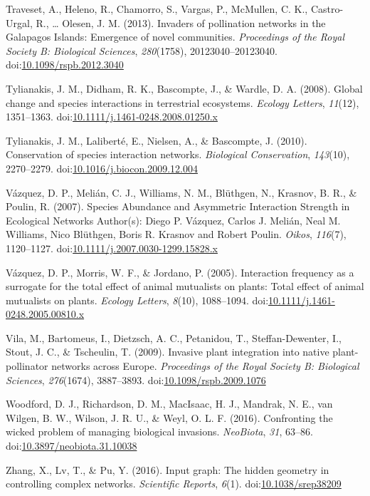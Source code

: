 \documentclass[a4paper]{artikel1}
\theoremstyle{definition}
\theoremstyle{definition}
\theoremstyle{definition}
\theoremstyle{remark}
\begin{document}
\hypertarget{ref-traveset_invaders_2013}{}
Traveset, A., Heleno, R., Chamorro, S., Vargas, P., McMullen, C. K.,
Castro-Urgal, R., \ldots{} Olesen, J. M. (2013). Invaders of pollination
networks in the Galapagos Islands: Emergence of novel communities.
\emph{Proceedings of the Royal Society B: Biological Sciences},
\emph{280}(1758), 20123040--20123040.
doi:\href{https://doi.org/10.1098/rspb.2012.3040}{10.1098/rspb.2012.3040}

\hypertarget{ref-tylianakis_global_2008}{}
Tylianakis, J. M., Didham, R. K., Bascompte, J., \& Wardle, D. A.
(2008). Global change and species interactions in terrestrial
ecosystems. \emph{Ecology Letters}, \emph{11}(12), 1351--1363.
doi:\href{https://doi.org/10.1111/j.1461-0248.2008.01250.x}{10.1111/j.1461-0248.2008.01250.x}

\hypertarget{ref-tylianakis_conservation_2010}{}
Tylianakis, J. M., Laliberté, E., Nielsen, A., \& Bascompte, J. (2010).
Conservation of species interaction networks. \emph{Biological
Conservation}, \emph{143}(10), 2270--2279.
doi:\href{https://doi.org/10.1016/j.biocon.2009.12.004}{10.1016/j.biocon.2009.12.004}

\hypertarget{ref-vazquez_species_2007}{}
Vázquez, D. P., Melián, C. J., Williams, N. M., Blüthgen, N., Krasnov,
B. R., \& Poulin, R. (2007). Species Abundance and Asymmetric
Interaction Strength in Ecological Networks Author(s): Diego P. Vázquez,
Carlos J. Melián, Neal M. Williams, Nico Blüthgen, Boris R. Krasnov and
Robert Poulin. \emph{Oikos}, \emph{116}(7), 1120--1127.
doi:\href{https://doi.org/10.1111/j.2007.0030-1299.15828.x}{10.1111/j.2007.0030-1299.15828.x}

\hypertarget{ref-vazquez_interaction_2005}{}
Vázquez, D. P., Morris, W. F., \& Jordano, P. (2005). Interaction
frequency as a surrogate for the total effect of animal mutualists on
plants: Total effect of animal mutualists on plants. \emph{Ecology
Letters}, \emph{8}(10), 1088--1094.
doi:\href{https://doi.org/10.1111/j.1461-0248.2005.00810.x}{10.1111/j.1461-0248.2005.00810.x}

\hypertarget{ref-vila_invasive_2009}{}
Vila, M., Bartomeus, I., Dietzsch, A. C., Petanidou, T.,
Steffan-Dewenter, I., Stout, J. C., \& Tscheulin, T. (2009). Invasive
plant integration into native plant-pollinator networks across Europe.
\emph{Proceedings of the Royal Society B: Biological Sciences},
\emph{276}(1674), 3887--3893.
doi:\href{https://doi.org/10.1098/rspb.2009.1076}{10.1098/rspb.2009.1076}

\hypertarget{ref-woodford_confronting_2016}{}
Woodford, D. J., Richardson, D. M., MacIsaac, H. J., Mandrak, N. E., van
Wilgen, B. W., Wilson, J. R. U., \& Weyl, O. L. F. (2016). Confronting
the wicked problem of managing biological invasions. \emph{NeoBiota},
\emph{31}, 63--86.
doi:\href{https://doi.org/10.3897/neobiota.31.10038}{10.3897/neobiota.31.10038}

\hypertarget{ref-zhang_input_2016}{}
Zhang, X., Lv, T., \& Pu, Y. (2016). Input graph: The hidden geometry in
controlling complex networks. \emph{Scientific Reports}, \emph{6}(1).
doi:\href{https://doi.org/10.1038/srep38209}{10.1038/srep38209}
\end{document}
